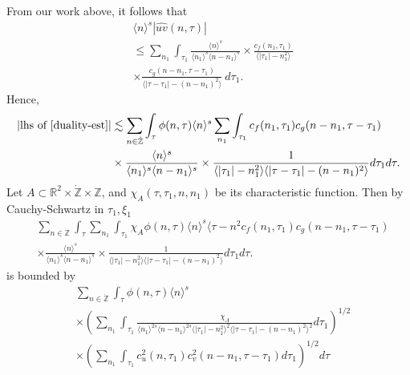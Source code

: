 \documentclass[12pt,reqno]{amsart}
\numberwithin{equation}{section}  %
\renewcommand{\cref}{\Cref}
\newcommand{\rr}{\mathbb{R}}
\newcommand{\zz}{\mathbb{Z}}
\newcommand{\zzdot}{\dot{\zz}}
\newcommand{\wh}{\widehat}
\begin{document}
%
%
From our work above, it follows that 
%
%
\begin{equation}
	\label{convo-est-starting-pnt}
	\begin{split}
		 & \langle n \rangle^s  | \wh{uv}\left( 
		n, \tau \right) |
		\\
		& \le  
		\sum_{n_{1}} \int_{\tau_{1}} \frac{\langle n \rangle^{s}}{\langle n_1 \rangle^s
    \langle n - n_1 \rangle^s} 
		\times \frac{c_f(n_1, \tau_1)}{\langle |\tau_1| - n_1^{2} \rangle}
		\\
		& \times
		\frac{c_g(n - n_1, \tau - \tau_1 )}{\langle |\tau - \tau_1| - (n - n_1)^{2}
    \rangle}\ d \tau_1.
	\end{split}
\end{equation}
%
%
Hence, 
%
%
\begin{equation}
  \label{pre-fubini-int-form}
	\begin{split}
    |\text{lhs of} \ \cref{duality-est}|
	& \lesssim \sum_{n \in \zzdot} \int_{\tau} \phi(n, \tau) \langle n \rangle^s 
  \sum_{n_{1}}
  \int_{\tau_{1}} c_f(n_1, \tau_1)
		c_g(n - n_1, \tau - \tau_1 )
		\\
    & \times \frac{\langle n \rangle ^{s}}{\langle n_{1} \rangle ^{s} \langle
    n-n_{1} \rangle ^{s}} \times \frac{1}{\langle |\tau_{1}|-n_{1}^{2} \rangle\langle | \tau -
    \tau_{1}|-(n - n_{1})^{2}
    \rangle} d \tau_1 d \tau.
	\end{split}
\end{equation}
%
Let $A \subset \rr^{2} \times \zzdot \times \zz$, and $\chi_{A}(\tau, \tau_{1}, n, n_{1})$
be its
characteristic function. Then by Cauchy-Schwartz in
$\tau_{1}, \xi_{1}$
\begin{equation*}
	\begin{split}
    & \sum_{n \in \zzdot} \int_{\tau}   \sum_{n_{1}}
    \int_{\tau_{1}} \chi_{A}
    \phi(n, \tau) \langle n \rangle^s \langle \tau - n^{2} 
  c_f(n_1, \tau_1)
		c_g(n - n_1, \tau - \tau_1 )
		\\
    & \times \frac{\langle n \rangle ^{s}}{\langle n_{1} \rangle ^{s} \langle
    n-n_{1} \rangle ^{s}} \times \frac{1}{\langle |\tau_{1}|-n_{1}^{2} \rangle\langle | \tau -
    \tau_{1}|-(n - n_{1})^{2}
    \rangle} d \tau_1 d \tau.
	\end{split}
\end{equation*}
%
is bounded by 
%
%
\begin{equation}
	\label{10g}
	\begin{split}
    & \sum_{n \in \zzdot} \int_{\tau} \phi(n, \tau) \langle n \rangle ^{s}
    \\
    & \times \left( \sum_{n_{1}} \int_{\tau_{1}}
    \frac{\chi_{A}}{\langle n_{1} \rangle ^{2s} \langle n-n_{1} \rangle ^{2s} \langle |
    \tau_{1} | - n_{1}^{2}\rangle^{2}  \langle | \tau - \tau_{1} | -
    (n - n_{1})^{2} \rangle^{2}} d \tau_{1} \right)^{1/2}
    \\
    & \times \left( \sum_{n_{1}} \int_{\tau_{1}} c_{u}^{2}(n, \tau_{1})
    c_{v}^{2}(n - n_{1}, \tau - \tau_{1}) d \tau_{1} \right)^{1/2} d \tau
  \end{split}
\end{equation}
\end{document}
